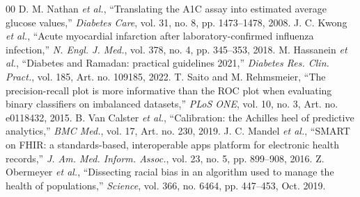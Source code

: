 \documentclass[conference]{IEEEtran}
\begin{document}
\begin{thebibliography}{00}
 D. M. Nathan \textit{et al.}, ``Translating the A1C assay into estimated average glucose values,'' \textit{Diabetes Care}, vol. 31, no. 8, pp. 1473--1478, 2008.
 J. C. Kwong \textit{et al.}, ``Acute myocardial infarction after laboratory-confirmed influenza infection,'' \textit{N. Engl. J. Med.}, vol. 378, no. 4, pp. 345--353, 2018.
 M. Hassanein \textit{et al.}, ``Diabetes and Ramadan: practical guidelines 2021,'' \textit{Diabetes Res. Clin. Pract.}, vol. 185, Art. no. 109185, 2022.
 T. Saito and M. Rehmsmeier, ``The precision-recall plot is more informative than the ROC plot when evaluating binary classifiers on imbalanced datasets,'' \textit{PLoS ONE}, vol. 10, no. 3, Art. no. e0118432, 2015.
 B. Van Calster \textit{et al.}, ``Calibration: the Achilles heel of predictive analytics,'' \textit{BMC Med.}, vol. 17, Art. no. 230, 2019.
 J. C. Mandel \textit{et al.}, ``SMART on FHIR: a standards-based, interoperable apps platform for electronic health records,'' \textit{J. Am. Med. Inform. Assoc.}, vol. 23, no. 5, pp. 899--908, 2016.
 Z. Obermeyer \textit{et al.}, ``Dissecting racial bias in an algorithm used to manage the health of populations,'' \textit{Science}, vol. 366, no. 6464, pp. 447--453, Oct. 2019.
\end{thebibliography}
\end{document}

